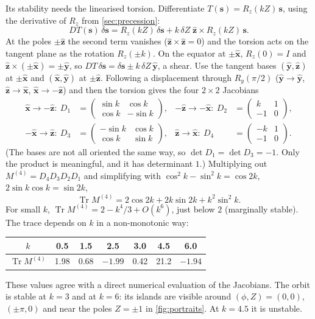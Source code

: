 \documentclass[11pt,a4paper]{article}
\newcommand{\vs}{\bm{s}}
\newcommand{\Tr}{\operatorname{Tr}}
\begin{document}
Its stability needs the linearised torsion. Differentiate $T(\vs) = R_z(kZ)\,\vs$, using the derivative of
$R_z$ from \cref{sec:precession}:
\begin{equation*}
  DT(\vs)\,\delta\vs = R_z(kZ)\,\delta\vs + k\,\delta Z\;\hat{\bm z}\times R_z(kZ)\,\vs .
\end{equation*}
At the poles $\pm\hat{\bm z}$ the second term vanishes ($\hat{\bm z}\times\hat{\bm z} = 0$) and the torsion acts on the
tangent plane as the rotation $R_z(\pm k)$. On the equator at $\pm\hat{\bm x}$, $R_z(0) = I$ and $\hat{\bm z}\times
(\pm\hat{\bm x}) = \pm\hat{\bm y}$, so $DT\,\delta\vs = \delta\vs \pm k\,\delta Z\,\hat{\bm y}$, a shear. Use the
tangent bases $(\hat{\bm y}, \hat{\bm z})$ at $\pm\hat{\bm x}$ and $(\hat{\bm x}, \hat{\bm y})$ at $\pm\hat{\bm z}$.
Following a displacement through $R_y(\pi/2)$ ($\hat{\bm y}\to\hat{\bm y}$, $\hat{\bm z}\to\hat{\bm x}$, $\hat{\bm
x}\to-\hat{\bm z}$) and then the torsion gives the four $2\times2$ Jacobians
\begin{align*}
  \hat{\bm x}\to-\hat{\bm z}:\ D_1 &= \begin{pmatrix}\sin k & \cos k\\ \cos k & -\sin k\end{pmatrix}, &
  -\hat{\bm z}\to-\hat{\bm x}:\ D_2 &= \begin{pmatrix}k & 1\\ -1 & 0\end{pmatrix}, \\
  -\hat{\bm x}\to\hat{\bm z}:\ D_3 &= \begin{pmatrix}-\sin k & \cos k\\ \cos k & \sin k\end{pmatrix}, &
  \hat{\bm z}\to\hat{\bm x}:\ D_4 &= \begin{pmatrix}-k & 1\\ -1 & 0\end{pmatrix}.
\end{align*}
(The bases are not all oriented the same way, so $\det D_1 = \det D_3 = -1$. Only the product is meaningful, and it
has determinant $1$.) Multiplying out $M^{(4)} = D_4 D_3 D_2 D_1$ and simplifying with $\cos^2k - \sin^2k = \cos2k$,
$2\sin k\cos k = \sin 2k$,
\begin{equation}\label{eq:period4-trace}
  \boxed{\Tr M^{(4)} = 2\cos 2k + 2k\sin 2k + k^2\sin^2 k .}
\end{equation}
For small $k$, $\Tr M^{(4)} = 2 - k^4/3 + O(k^6)$, just below $2$ (marginally stable). The trace depends on $k$ in a
non-monotonic way:
\begin{center}
\begin{tabular}{ccccccc}
\toprule
$k$ & 0.5 & 1.5 & 2.5 & 3.0 & 4.5 & 6.0\\
\midrule
$\Tr M^{(4)}$ & 1.98 & 0.68 & $-1.99$ & 0.42 & 21.2 & $-1.94$ \\
\bottomrule
\end{tabular}
\end{center}
These values agree with a direct numerical evaluation of the Jacobians. The orbit is stable at $k = 3$ and at $k = 6$:
its islands are visible around $(\phi,Z) = (0,0)$, $(\pm\pi, 0)$ and near the poles $Z = \pm1$ in
\cref{fig:portraits}. At $k = 4.5$ it is unstable.
\end{document}

